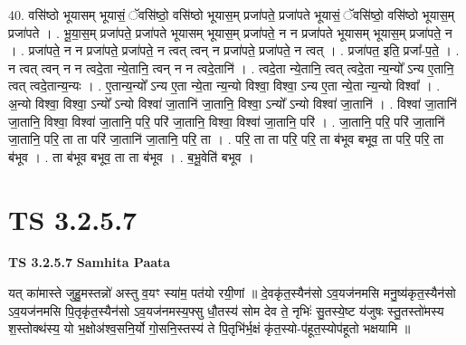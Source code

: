 \documentclass[17pt]{extarticle}
\begin{document}
40. वसि॑ष्ठो भूयासम् भूयासं॒ ॅवसि॑ष्ठो॒ वसि॑ष्ठो भूयास॒म् प्रजा॑पते॒ प्रजा॑पते भूयासं॒ ॅवसि॑ष्ठो॒ वसि॑ष्ठो भूयास॒म् प्रजा॑पते । . भू॒या॒स॒म् प्रजा॑पते॒ प्रजा॑पते भूयासम् भूयास॒म् प्रजा॑पते॒ न न प्रजा॑पते भूयासम् भूयास॒म् प्रजा॑पते॒ न । . प्रजा॑पते॒ न न प्रजा॑पते॒ प्रजा॑पते॒ न त्वत् त्वन् न प्रजा॑पते॒ प्रजा॑पते॒ न त्वत् । . प्रजा॑पत॒ इति॒ प्रजा᳚-प॒ते॒ । . न त्वत् त्वन् न न त्वदे॒ता न्ये॒तानि॒ त्वन् न न त्वदे॒तानि॑ । . त्वदे॒ता न्ये॒तानि॒ त्वत् त्वदे॒ता न्य॒न्यो᳚ ऽन्य ए॒तानि॒ त्वत् त्वदे॒तान्य॒न्यः । . ए॒तान्य॒न्यो᳚ ऽन्य ए॒ता न्ये॒ता न्य॒न्यो विश्वा॒ विश्वा॒ ऽन्य ए॒ता न्ये॒ता न्य॒न्यो विश्वा᳚ । . अ॒न्यो विश्वा॒ विश्वा॒ ऽन्यो᳚ ऽन्यो विश्वा॑ जा॒तानि॑ जा॒तानि॒ विश्वा॒ ऽन्यो᳚ ऽन्यो विश्वा॑ जा॒तानि॑ । . विश्वा॑ जा॒तानि॑ जा॒तानि॒ विश्वा॒ विश्वा॑ जा॒तानि॒ परि॒ परि॑ जा॒तानि॒ विश्वा॒ विश्वा॑ जा॒तानि॒ परि॑ । . जा॒तानि॒ परि॒ परि॑ जा॒तानि॑ जा॒तानि॒ परि॒ ता ता परि॑ जा॒तानि॑ जा॒तानि॒ परि॒ ता । . परि॒ ता ता परि॒ परि॒ ता ब॑भूव बभूव॒ ता परि॒ परि॒ ता ब॑भूव । . ता ब॑भूव बभूव॒ ता ता ब॑भूव । . ब॒भू॒वेति॑ बभूव । \newline
\pagebreak
{}

\section{ TS 3.2.5.7 }

\textbf{TS 3.2.5.7 } \newline
\textbf{Samhita Paata} \newline

यत् का॑मास्ते जुहु॒मस्तन्नो॑ अस्तु व॒यꣳ स्या॑म॒ पत॑यो रयी॒णां ॥ दे॒वकृ॑त॒स्यैन॑सो ऽव॒यज॑नमसि मनु॒ष्य॑कृत॒स्यैन॑सो ऽव॒यज॑नमसि पि॒तृकृ॑त॒स्यैन॑सो ऽव॒यज॑नमस्य॒फ्सु धौ॒तस्य॑ सोम देव ते॒ नृभिः॑ सु॒तस्ये॒ष्ट य॑जुषः स्तु॒तस्तो॑मस्य श॒स्तोक्थ॑स्य॒ यो भ॒क्षोअ॑श्व॒सनि॒र्यो गो॒सनि॒स्तस्य॑ ते पि॒तृभि॑र्भ॒क्षं कृ॑त॒स्यो-प॑हूत॒स्योप॑हूतो भक्षयामि ॥ \newline
\end{document}
